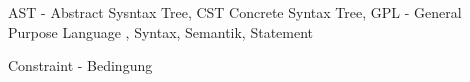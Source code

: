 


AST - Abstract Sysntax Tree, CST Concrete Syntax Tree, GPL - General Purpose Language , Syntax, Semantik, Statement

Constraint - Bedingung